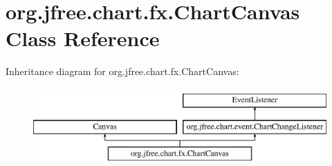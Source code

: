 \hypertarget{classorg_1_1jfree_1_1chart_1_1fx_1_1_chart_canvas}{}\section{org.\+jfree.\+chart.\+fx.\+Chart\+Canvas Class Reference}
\label{classorg_1_1jfree_1_1chart_1_1fx_1_1_chart_canvas}
Inheritance diagram for org.\+jfree.\+chart.\+fx.\+Chart\+Canvas\+:\begin{figure}[H]
\begin{center}
\leavevmode
\includegraphics[height=3.000000cm]{classorg_1_1jfree_1_1chart_1_1fx_1_1_chart_canvas}
\end{center}
\end{figure}
